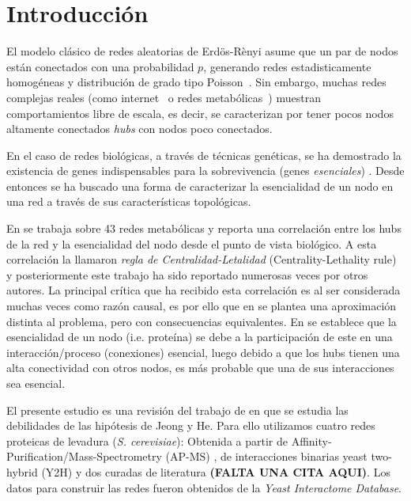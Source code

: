 \section{Introducci\'on}
El modelo cl\'asico de redes aleatorias de Erd\"os-R\`enyi asume que un par de 
nodos est\'an conectados con una probabilidad $p$, generando redes estadisticamente
homog\'eneas y distribuci\'on de grado tipo Poisson~\citep{jeong2000}. Sin embargo, 
muchas redes complejas reales (como internet~\citep{faloutsos1999} o 
redes metab\'olicas~\citep{jeong2000}) muestran comportamientos libre de 
escala, es decir, se caracterizan por tener pocos nodos altamente conectados 
\textit{hubs} con nodos poco conectados.

En el caso de redes biol\'ogicas, a trav\'es de t\'ecnicas gen\'eticas, se ha 
demostrado la existencia de genes indispensables para la sobrevivencia (genes
\textit{esenciales}) \citep{kamath2003,winzeler1999}. Desde entonces se ha 
buscado una forma de caracterizar la esencialidad de un nodo en una red a 
trav\'es de sus caracter\'isticas topol\'ogicas.

En \citet{jeong2000} se trabaja sobre 43 redes metab\'olicas y reporta una 
correlaci\'on entre los hubs de la red y la esencialidad del nodo desde 
el punto de vista biol\'ogico. A esta correlaci\'on la llamaron 
\textit{regla de Centralidad-Letalidad} (Centrality-Lethality rule) y 
posteriormente este trabajo ha sido reportado numerosas veces por otros 
autores. La principal cr\'itica que ha recibido esta correlaci\'on es al ser
considerada muchas veces como raz\'on causal, es por ello que en
\citet{he2006} se plantea una aproximaci\'on distinta al problema, pero 
con consecuencias equivalentes. En \citet{he2006} se establece que la
esencialidad de un nodo (i.e. prote\'ina) se debe a la participaci\'on de 
este en una interacci\'on/proceso (conexiones) esencial, luego debido 
a que los hubs tienen una alta conectividad con otros nodos, es m\'as 
probable que una de sus interacciones sea esencial.


El presente estudio es una revisi\'on del trabajo de \citet{zotenko2008} en que 
se estudia las debilidades de las hip\'otesis de Jeong y He. Para ello utilizamos
cuatro redes proteicas de levadura (\textit{S. cerevisiae}): Obtenida a partir 
de Affinity-Purification/Mass-Spectrometry (AP-MS) \citep{apms_data}, de 
interacciones binarias yeast two-hybrid (Y2H) \citep{y2h_data} y dos curadas 
de literatura \citep{lit_data} {\bf (FALTA UNA CITA AQUI)}. Los datos para 
construir las redes fueron obtenidos de la \textit{Yeast Interactome Database}.
